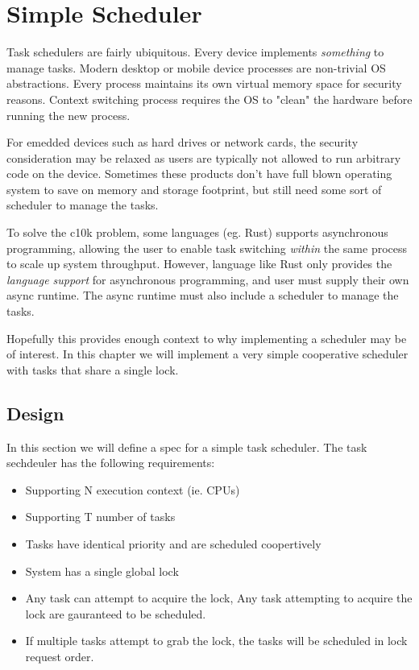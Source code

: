 % 

\chapter{Simple Scheduler}

Task schedulers are fairly ubiquitous. Every device implements
\textit{something} to manage tasks. Modern desktop or mobile device processes
are non-trivial OS abstractions. Every process maintains its own virtual memory
space for security reasons. Context switching process requires the OS to "clean"
the hardware before running the new process.\newline

For emedded devices such as hard drives or network cards, the security
consideration may be relaxed as users are typically not allowed to run arbitrary
code on the device. Sometimes these products don't have full blown operating
system to save on memory and storage footprint, but still need some sort of
scheduler to manage the tasks.\newline

To solve the c10k \cite{c10k} problem, some languages (eg. Rust) supports
asynchronous programming, allowing the user to enable task switching 
\textit{within} the same process to scale up system throughput.  However,
language like Rust only provides the \textit{language support} for asynchronous
programming, and user must supply their own async runtime. The async runtime
must also include a scheduler to manage the tasks.\newline

Hopefully this provides enough context to why implementing a scheduler may be of
interest. In this chapter we will implement a very simple cooperative
scheduler with tasks that share a single lock.

\section{Design}

In this section we will define a spec for a simple task scheduler. The task sechdeuler has the following
requirements:
\begin{itemize}
    \item Supporting N execution context (ie. CPUs)
    \item Supporting T number of tasks
    \item Tasks have identical priority and are scheduled coopertively
    \item System has a single global lock
    \item Any task can attempt to acquire the lock, Any task attempting to
    acquire the lock are gauranteed to be scheduled.
    \item If multiple tasks attempt to grab the lock, the tasks will be
    scheduled in lock request order. 
\end{itemize}


